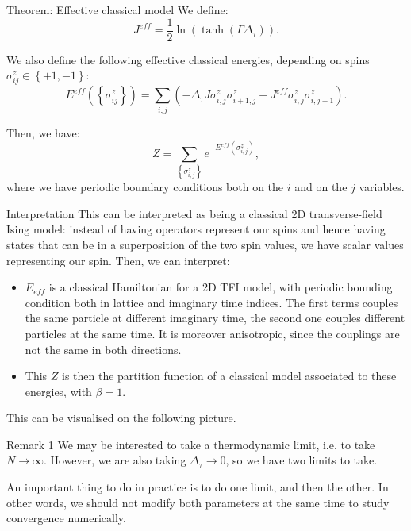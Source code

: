 \documentclass[a4paper]{article}
\begin{document}
\begin{parag}{Theorem: Effective classical model}
    We define:
    \[J^{eff} = \frac{1}{2} \ln\left(\tanh\left(\Gamma \Delta_{\tau}\right)\right).\]

    We also define the following effective classical energies, depending on spins $\sigma_{ij}^z \in \left\{+1, -1\right\}$:
    \[E^{eff}\left(\left\{\sigma_{i j}^z\right\}\right) = \sum_{i, j} \left(-\Delta_{\tau} J \sigma_{i, j}^z \sigma_{i+1, j}^z + J^{eff} \sigma_{i, j}^z \sigma_{i, j+1}^z\right).\]

    Then, we have:
    \[Z = \sum_{\left\{\sigma^z_{i, j}\right\}} e^{-E^{eff}\left(\sigma_{i, j}^z\right)},\]
    where we have periodic boundary conditions both on the $i$ and on the $j$ variables.

    \begin{subparag}{Interpretation}
        This can be interpreted as being a classical 2D transverse-field Ising model: instead of having operators represent our spins and hence having states that can be in a superposition of the two spin values, we have scalar values representing our spin. Then, we can interpret:
        \begin{itemize}[left=0pt]
            \item $E_{eff}$ is a classical Hamiltonian for a 2D TFI model, with periodic bounding condition both in lattice and imaginary time indices. The first terms couples the same particle at different imaginary time, the second one couples different particles at the same time. It is moreover anisotropic, since the couplings are not the same in both directions. 
            \item This $Z$ is then the partition function of a classical model associated to these energies, with $\beta = 1$.
        \end{itemize}

        This can be visualised on the following picture.
    \end{subparag}

    \begin{subparag}{Remark 1}
        We may be interested to take a thermodynamic limit, i.e. to take $N \to \infty$. However, we are also taking $\Delta_{\tau} \to 0$, so we have two limits to take.

        An important thing to do in practice is to do one limit, and then the other. In other words, we should not modify both parameters at the same time to study convergence numerically.
    \end{subparag}


\end{parag}
\end{document}
